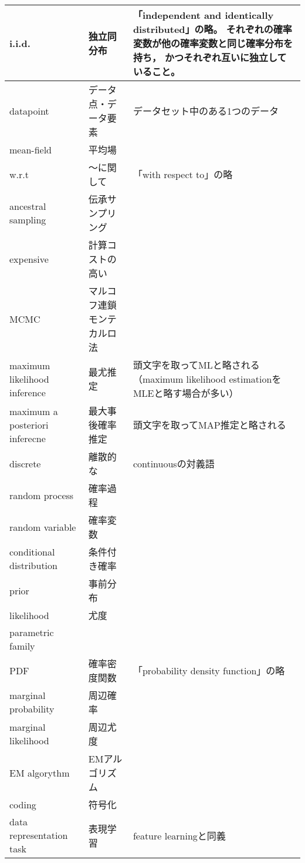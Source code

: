 \documentclass[dvipdfmx, fleqn]{jsarticle}
\begin{document}
\begin{longtable}{p{4cm}p{4cm}p{7cm}}
            \tabularnewline \hline
        i.i.d.
            & 独立同分布
            & 「independent and identically distributed」の略。
            それぞれの確率変数が他の確率変数と同じ確率分布を持ち，
            かつそれぞれ互いに独立していること。
            \tabularnewline \hline
        datapoint
            & データ点・データ要素
            & データセット中のある1つのデータ
            \tabularnewline \hline
        mean-field
            & 平均場
            & 
            \tabularnewline \hline
        w.r.t
            & ～に関して
            & 「with respect to」の略
            \tabularnewline \hline
        ancestral sampling
            & 伝承サンプリング
            & 
            \tabularnewline \hline
        expensive
            & 計算コストの高い
            & 
            \tabularnewline \hline
        MCMC
            & マルコフ連鎖モンテカルロ法
            & 
            \tabularnewline \hline
        maximum likelihood inference
            & 最尤推定
            & 頭文字を取ってMLと略される
            （maximum likelihood estimationをMLEと略す場合が多い）
            \tabularnewline \hline
        maximum a posteriori inferecne
            & 最大事後確率推定
            & 頭文字を取ってMAP推定と略される
            \tabularnewline \hline
        discrete
            & 離散的な
            & continuousの対義語
            \tabularnewline \hline
        random process
            & 確率過程
            & 
            \tabularnewline \hline
        random variable
            & 確率変数
            & 
            \tabularnewline \hline
        conditional distribution
            & 条件付き確率
            & 
            \tabularnewline \hline
        prior
            & 事前分布
            & 
            \tabularnewline \hline
        likelihood
            & 尤度
            & 
            \tabularnewline \hline
        parametric family
            & 
            & 
            \tabularnewline \hline
        PDF
            & 確率密度関数
            & 「probability density function」の略
            \tabularnewline \hline
        marginal probability
            & 周辺確率
            & 
            \tabularnewline \hline
        marginal likelihood
            & 周辺尤度
            & 
            \tabularnewline \hline
        EM algorythm
            & EMアルゴリズム
            & 
            \tabularnewline \hline
        coding
            & 符号化
            & 
            \tabularnewline \hline
        data representation task
            & 表現学習
            & feature learningと同義
            \tabularnewline \hline

\end{longtable}
\end{document}
